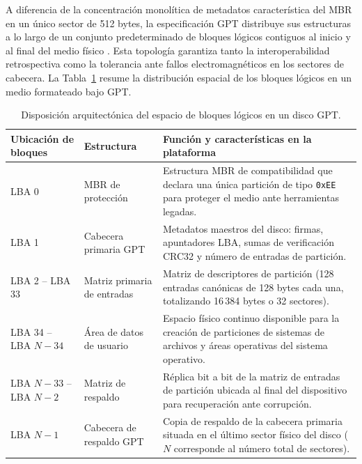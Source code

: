 \documentclass[12pt]{article}
\begin{document}
A diferencia de la concentración monolítica de metadatos característica del MBR en un único sector de 512 bytes, la especificación GPT distribuye sus estructuras a lo largo de un conjunto predeterminado de bloques lógicos contiguos al inicio y al final del medio físico \parencite[\S 5.3.1, pp.\ 113--115]{uefi2024specification}. Esta topología garantiza tanto la interoperabilidad retrospectiva como la tolerancia ante fallos electromagnéticos en los sectores de cabecera. La Tabla~\ref{tab:disposicionLbaGpt} resume la distribución espacial de los bloques lógicos en un medio formateado bajo GPT.

\begin{table}[!t]
\centering
\small
\renewcommand{\arraystretch}{1.1}
\renewcommand{\tabularxcolumn}[1]{m{#1}}
\setlength{\emergencystretch}{1.5em}
\caption{Disposición arquitectónica del espacio de bloques lógicos en un disco GPT.}
\label{tab:disposicionLbaGpt}
\begin{tabularx}{\textwidth}{>{\centering\arraybackslash}m{3.0cm} >{\centering\arraybackslash}m{2.2cm} X}
\toprule
\textbf{Ubicación de bloques} & \textbf{Estructura} & \textbf{Función y características en la plataforma} \\
\midrule
LBA 0 & MBR de protección & Estructura MBR de compatibilidad que declara una única partición de tipo \texttt{0xEE} para proteger el medio ante herramientas legadas. \\
\addlinespace
LBA 1 & Cabecera primaria GPT & Metadatos maestros del disco: firmas, apuntadores LBA, sumas de verificación CRC32 y número de entradas de partición. \\
\addlinespace
LBA 2 -- LBA 33 & Matriz primaria de entradas & Matriz de descriptores de partición (128 entradas canónicas de 128 bytes cada una, totalizando 16\,384 bytes o 32 sectores). \\
\addlinespace
LBA 34 -- LBA $N-34$ & Área de datos de usuario & Espacio físico continuo disponible para la creación de particiones de sistemas de archivos y áreas operativas del sistema operativo. \\
\addlinespace
LBA $N-33$ -- LBA $N-2$ & Matriz de respaldo & Réplica bit a bit de la matriz de entradas de partición ubicada al final del dispositivo para recuperación ante corrupción. \\
\addlinespace
LBA $N-1$ & Cabecera de respaldo GPT & Copia de respaldo de la cabecera primaria situada en el último sector físico del disco ($N$ corresponde al número total de sectores). \\
\bottomrule
\end{tabularx}
\end{table}
\end{document}
